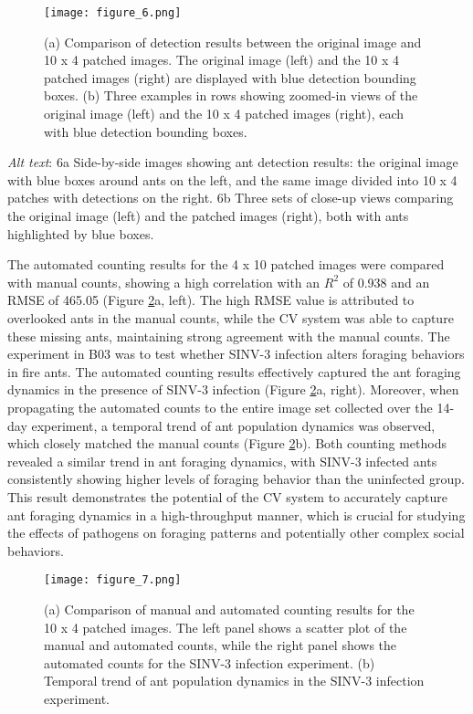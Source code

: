 \begin{figure}[H]
    \centering
    \texttt{[image: figure\_6.png]}
    \caption{(a) Comparison of detection results between the original image and 10 x 4 patched images. The original image (left) and the 10 x 4 patched images (right) are displayed with blue detection bounding boxes. (b) Three examples in rows showing zoomed-in views of the original image (left) and the 10 x 4 patched images (right), each with blue detection bounding boxes.}
    \label{fig:figure6}
\end{figure}

\textit{Alt text}: 6a Side-by-side images showing ant detection results: the original image with blue boxes around ants on the left, and the same image divided into 10 x 4 patches with detections on the right. 6b Three sets of close-up views comparing the original image (left) and the patched images (right), both with ants highlighted by blue boxes.

The automated counting results for the 4 x 10 patched images were compared with manual counts, showing a high correlation with an $R^2$ of 0.938 and an RMSE of 465.05 (Figure \ref{fig:figure7}a, left). The high RMSE value is attributed to overlooked ants in the manual counts, while the CV system was able to capture these missing ants, maintaining strong agreement with the manual counts. The experiment in B03 was to test whether SINV-3 infection alters foraging behaviors in fire ants. The automated counting results effectively captured the ant foraging dynamics in the presence of SINV-3 infection (Figure \ref{fig:figure7}a, right). Moreover, when propagating the automated counts to the entire image set collected over the 14-day experiment, a temporal trend of ant population dynamics was observed, which closely matched the manual counts (Figure \ref{fig:figure7}b). Both counting methods revealed a similar trend in ant foraging dynamics, with SINV-3 infected ants consistently showing higher levels of foraging behavior than the uninfected group. This result demonstrates the potential of the CV system to accurately capture ant foraging dynamics in a high-throughput manner, which is crucial for studying the effects of pathogens on foraging patterns and potentially other complex social behaviors.

\begin{figure}[H]
    \centering
    \texttt{[image: figure\_7.png]}
    \caption{(a) Comparison of manual and automated counting results for the 10 x 4 patched images. The left panel shows a scatter plot of the manual and automated counts, while the right panel shows the automated counts for the SINV-3 infection experiment. (b) Temporal trend of ant population dynamics in the SINV-3 infection experiment.}
    \label{fig:figure7}
\end{figure}

